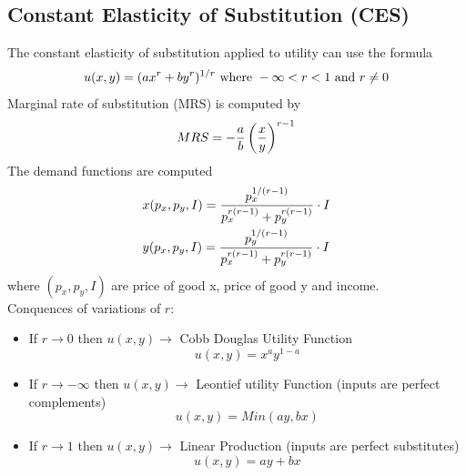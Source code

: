 \documentclass[a4paper, 12pt, reqno]{article}
\begin{document}
\subsection{Constant Elasticity of Substitution (CES)}
The constant elasticity of substitution applied to utility can use the formula
\begin{equation}
    u(x,y) = (ax^{r}+by^{r})^{1/r} \mbox{ where } -\infty <r<1 \mbox{ and } r\neq 0
    \notag
\end{equation}
Marginal rate of substitution (MRS) is computed by
\begin{equation}
    MRS = -\frac{a}{b} \left( \frac{x}{y}\right) ^{r-1}
    \notag
\end{equation}  
The demand functions are computed
\begin{equation}
\begin{split}    
&x(p_x,p_y,I) = \frac{p_{x}^{1/(r-1)}}{p_{x}^{r(r-1)}+p_{y}^{r(r-1)}}\cdot I \\
&y(p_x,p_y,I) = \frac{p_{y}^{1/(r-1)}}{p_{x}^{r(r-1)}+p_{y}^{r(r-1)}}\cdot I
\notag 
\end{split}   
\end{equation} 
where $(p_x,p_y,I)$ are price of good x, price of good y and income. \\
Conquences of variations of $r$:
\begin{itemize}
    \item If $ r \rightarrow 0$ then $u(x,y) \rightarrow$ Cobb Douglas Utility Function $$ u(x,y) = x^{a}y^{1-a}$$
    \item If $ r \rightarrow - \infty $ then $u(x,y) \rightarrow$ Leontief utility Function (inputs are perfect complements) $$ u(x,y) = Min(ay, bx)$$
    \item If $ r \rightarrow 1 $ then $u(x,y) \rightarrow$ Linear Production (inputs are perfect substitutes) $$ u(x,y) = ay + bx$$
\end{itemize} 
\end{document}
